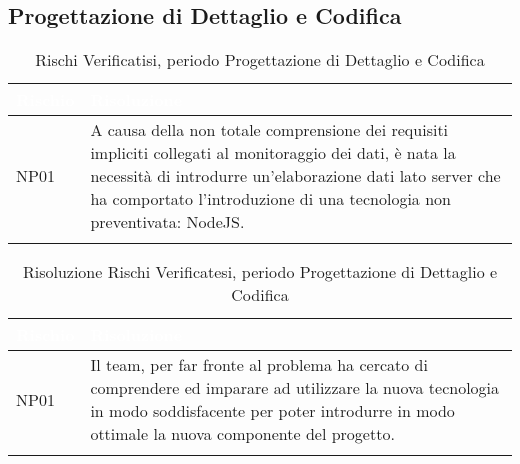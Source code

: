 \subsection{Progettazione di Dettaglio e Codifica}\label{ARRQ}
\begin{longtable}{|C{.15\textwidth}|C{.79\textwidth}|}
	\hline
	\textbf{\textcolor{white}{Rischio}} & \textbf{\textcolor{white}{Risoluzione}} \\
	\hline \hline
	\endfirsthead
	NP01 & A causa della non totale comprensione dei requisiti impliciti collegati al monitoraggio dei dati, è nata la necessità di introdurre un'elaborazione dati lato server che ha comportato l'introduzione di una tecnologia non preventivata: NodeJS.\\ 
	\hline
	\caption{Rischi Verificatisi, periodo Progettazione di Dettaglio e Codifica}
	\label{tab:analisiRischiRQ}
\end{longtable}

\begin{longtable}{|C{.15\textwidth}|C{.79\textwidth}|}
	\hline
	\textbf{\textcolor{white}{Rischio}} & \textbf{\textcolor{white}{Risoluzione}} \\
	\hline \hline
	\endfirsthead
	NP01 & Il team, per far fronte al problema ha cercato di comprendere ed imparare ad utilizzare la nuova tecnologia in modo soddisfacente per poter introdurre in modo ottimale la nuova componente del progetto.\\ 
	\hline
	\caption{Risoluzione Rischi Verificatesi, periodo Progettazione di Dettaglio e Codifica}
	\label{tab:risoluzioneRischiRQ}
\end{longtable}

